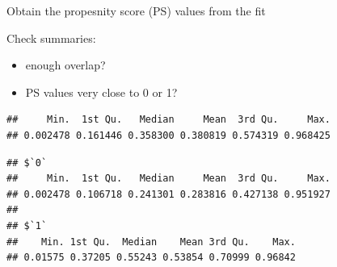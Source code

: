 \documentclass[
]{book}
\newenvironment{Shaded}{\begin{snugshade}}{\end{snugshade}}
\newcommand{\AttributeTok}[1]{\textcolor[rgb]{0.77,0.63,0.00}{#1}}
\newcommand{\FunctionTok}[1]{\textcolor[rgb]{0.00,0.00,0.00}{#1}}
\newcommand{\NormalTok}[1]{#1}
\newcommand{\OtherTok}[1]{\textcolor[rgb]{0.56,0.35,0.01}{#1}}
\newcommand{\SpecialCharTok}[1]{\textcolor[rgb]{0.00,0.00,0.00}{#1}}
\newcommand{\StringTok}[1]{\textcolor[rgb]{0.31,0.60,0.02}{#1}}
\providecommand{\tightlist}{%
  \setlength{\itemsep}{0pt}\setlength{\parskip}{0pt}}
\begin{document}
Obtain the propesnity score (PS) values from the fit

\begin{Shaded}
\end{Shaded}

Check summaries:

\begin{itemize}
\tightlist
\item
  enough overlap?
\item
  PS values very close to 0 or 1?
\end{itemize}

\begin{Shaded}
\end{Shaded}

\begin{verbatim}
##     Min.  1st Qu.   Median     Mean  3rd Qu.     Max. 
## 0.002478 0.161446 0.358300 0.380819 0.574319 0.968425
\end{verbatim}

\begin{Shaded}
\end{Shaded}

\begin{verbatim}
## $`0`
##     Min.  1st Qu.   Median     Mean  3rd Qu.     Max. 
## 0.002478 0.106718 0.241301 0.283816 0.427138 0.951927 
## 
## $`1`
##    Min. 1st Qu.  Median    Mean 3rd Qu.    Max. 
## 0.01575 0.37205 0.55243 0.53854 0.70999 0.96842
\end{verbatim}
\end{document}
